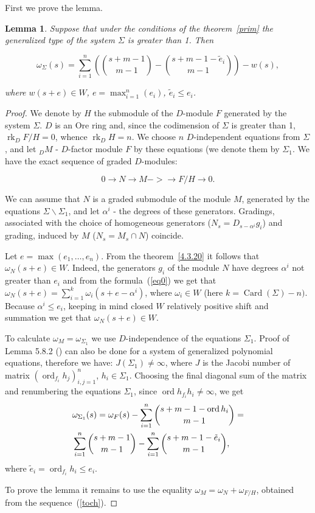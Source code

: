 \documentclass[a4paper,reqno,12pt]{amsart}
\theoremstyle{plain}
\newtheorem{lemma}{Lemma}
\theoremstyle{remark}
\theoremstyle{definition}
\renewcommand{\le}{\leqslant}
\DeclareMathOperator {\ord}{ord}
\DeclareMathOperator {\Card}{Card}
\DeclareMathOperator {\rk}{rk}
\def\ord{\operatorname{ord}}
\begin{document}
First we prove the lemma.
\begin{lemma}\label{lemma1}
Suppose that under the conditions of the theorem~\ref{prim} 
the generalized type of the system $ \Sigma $ is greater than 1.
Then

\begin {equation} \label {W}
\omega_\Sigma (s) = \sum_ {i = 1}^n
\left (\binom {s + m-1} {m-1} - \binom {s + m-1- \tilde e_i}{m-1}\right)
-w (s),
\end {equation}

where $w(s + e)\in W $, $e=\max_ {i = 1}^ n (e_i) $, $ \tilde e_i 
\le e_i$.
\end{lemma}
\begin{proof}
We denote by $H$ the submodule of the $D$-module $F$ 
generated by the system   $\Sigma$.
$D$ is an Ore ring and, since the codimension of $\Sigma$ is greater 
than 1,  $\rk_D F/H = 0$, whence
$\rk_D H = n$. We choose $n$ $D$-independent equations from
 $\Sigma $,
and let $ _DM$ - $D$-factor module $F$ by
these equations (we denote them by $\Sigma_1$. We have the exact 
sequence of graded $D$-modules:

\begin{equation}\label{toch}
0\to N\to M->\to F/H\to 0.
\end{equation}

We can assume that $N$ is a graded submodule of the module $M$,
generated by the equations $\Sigma\backslash\Sigma_1$, and let 
$\alpha^i$ - the degrees of these generators.
Gradings, associated with the choice of  homogeneous 
generators ($N_s=D_{s- \alpha^i} g_i$) and grading,
induced by $M$
($N_s = M_s \cap N$) 
coincide.


Let $e =\max (e_1, \dots, e_n)$. From the theorem~\ref{4.3.20} it 
follows that
$\omega_N (s + e)\in W $. Indeed, the generators 
$g_i$ of the module $N$
have degrees $\alpha^i$ not greater than $e_i$ and from the 
formula~(\ref{eq0})
we get that $\omega_N(s + e)=\sum_{i=1}^k\omega_i(s+e-\alpha^i)$, 
where   $\omega_i \in W$
(here  $k = \Card (\Sigma) -n)$. Because $\alpha^i\le e_i$,
keeping in mind  closed $W$ relatively positive
shift and summation  we get that $\omega_N(s + e)\in W$.

To calculate $\omega_M = \omega_{\Sigma_1}$ we use
$D$-independence of the equations $\Sigma_1$. Proof of Lemma 5.8.2
(\cite {KLMP}) can also be done for a system of generalized polynomial
equations, therefore we have: $J(\Sigma_1) \ne \infty $, where $J$ is 
the Jacobi number  of
matrix $(\ord_ {f_i} h_j)_{i, j = 1}^n$, $h_i\in \Sigma_1$. 
Choosing the final diagonal
 sum of the matrix and renumbering the equations $\Sigma_1$, 
since $\ord h_ {f_i} h_i \ne \infty $,
we get
\begin{align}
&\omega_{\Sigma_1}(s)=\omega_F(s)-\sum_{i=1}^n\binom{s+m-1-\ord h_i}{m-1}= \notag  \\
&
\sum_{i=1}^n\binom{s+m-1}{m-1}-\sum_{i=1}^n\binom{s+m-1-\tilde e_i}{m-1}, \notag
\end{align}
where $\tilde e_i=\ord_{f_i} h_i\le e_i$. 

To prove the lemma it remains to use the equality
$\omega_M =\omega_N + \omega_{F / H}$,
obtained from the sequence~(\ref{toch}).

\end{proof}
\end{document}
